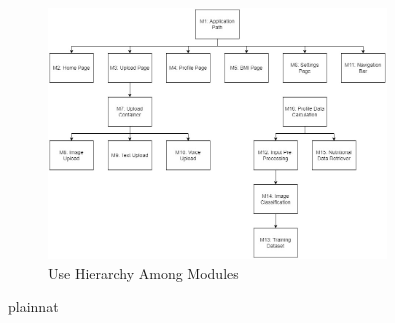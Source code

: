 \documentclass[12pt, titlepage]{article}
\begin{document}
\begin{figure}[H]
\centering
\includegraphics[width=0.8\textwidth]{uses_hierarchy.jpg}
\caption{Use Hierarchy Among Modules}
\label{FigUH}
\end{figure}


 {plainnat}

\end{document}
